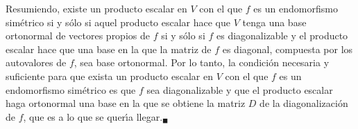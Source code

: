 \begin{solucion}
 \par 
 Resumiendo, existe un producto escalar en $V$ con el que $f$ es un endomorfismo sim\'etrico si y s\'olo si aquel producto escalar hace que $V$ tenga una base ortonormal de vectores propios de $f$ si y s\'olo si $f$ es diagonalizable y el producto escalar hace que una base en la que la matriz de $f$ es diagonal, compuesta por los autovalores de $f$, sea base ortonormal. Por lo tanto, la condici\'on necesaria y suficiente para que exista un producto escalar en $V$ con el que $f$ es un endomorfismo sim\'etrico es que $f$ sea diagonalizable y que el producto escalar haga ortonormal una base en la que se obtiene la matriz $D$ de la diagonalizaci\'on de $f$, que es a lo que se quer\'{\i}a llegar.${}_{\blacksquare}$
\end{solucion}
